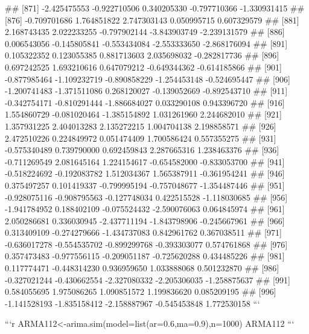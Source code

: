 \documentclass[
]{article}
\begin{document}
\begin{enumerate}[label=(\alph*)]
##  [871] -2.425475553 -0.922710506  0.340205330 -0.797710366 -1.330931415
##  [876] -0.709701686  1.764851822  2.747303143  0.050995715  0.607329579
##  [881]  2.168743435  2.022233255 -0.797902144 -3.843903749 -2.239131579
##  [886]  0.006543056 -0.145805841 -0.553434084 -2.553333650 -2.868176094
##  [891]  0.105322352  0.123055385  0.881713603  2.035698032 -0.282817736
##  [896]  0.697242525  1.693210616  0.647079212 -0.649344362 -0.614185866
##  [901] -0.877985464 -1.109232719 -0.890858229 -1.254453148 -0.524695447
##  [906] -1.200741483 -1.371511086  0.268120027 -0.139052669 -0.892543710
##  [911] -0.342754171 -0.810291444 -1.886684027  0.033290108  0.943396720
##  [916]  1.554860729 -0.081020464 -1.385154892  1.031261960  2.244682010
##  [921]  1.357931225  2.404013283  2.135272215  1.004704138  2.198858571
##  [926]  2.472510226  0.224849972  0.051474409  1.700586424  0.557355275
##  [931] -0.575340489  0.739790000  0.692459843  2.287665316  1.238463376
##  [936] -0.711269549  2.081645164  1.224154617 -0.654582000 -0.833053700
##  [941] -0.518224692 -0.192083782  1.512034367  1.565387911 -0.361954241
##  [946]  0.375497257  0.101419337 -0.799995194 -0.757048677 -1.354487446
##  [951] -0.928075116 -0.908795563 -0.127748034  0.422515528 -1.118030685
##  [956] -1.941784952  0.188402109 -0.075524432 -2.590076063  0.064845974
##  [961]  2.050286681  0.336030945 -2.437711194 -1.843798906 -0.245667961
##  [966]  0.313409109 -0.274279666 -1.434737083  0.842961762  0.367038511
##  [971] -0.636017278 -0.554535702 -0.899299768 -0.393303077  0.574761868
##  [976]  0.357473483 -0.977556115 -0.209051187 -0.725620288  0.434485226
##  [981]  0.117774471 -0.448314230  0.936959650  1.033888068  0.501232870
##  [986] -0.327021244 -0.430662554 -2.327080332 -2.205306035 -1.258875637
##  [991]  0.584055695  1.975086265  1.090851572  1.199836620  0.085209195
##  [996] -1.141528193 -1.835158412 -2.158887967 -0.545453848  1.772530158
```

```r
ARMA112<-arima.sim(model=list(ar=0.6,ma=0.9),n=1000)
ARMA112
```


\end{enumerate}
\end{document}
